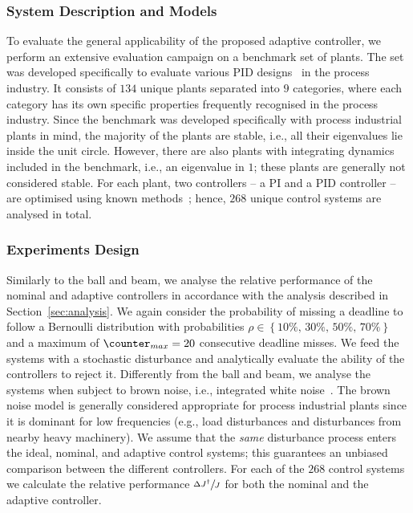 \subsubsection*{System Description and Models}
To evaluate the general applicability of the proposed adaptive controller, we perform an extensive evaluation campaign on a benchmark set of plants.
The set was developed specifically to evaluate various PID designs~\cite{Astrom:2004} in the process industry.
It consists of $134$ unique plants separated into $9$ categories, where each category has its own specific properties frequently recognised in the process industry.
Since the benchmark was developed specifically with process industrial plants in mind, the majority of the plants are stable, i.e., all their eigenvalues lie inside the unit circle.
However, there are also plants with integrating dynamics included in the benchmark, i.e., an eigenvalue in $1$; these plants are generally not considered stable.
For each plant, two controllers -- a PI and a PID controller -- are optimised using known methods~\cite{Garpinger:2008}; hence, $268$ unique control systems are analysed in total.

\subsubsection*{Experiments Design}
Similarly to the ball and beam, we analyse the relative performance of the nominal and adaptive controllers in accordance with the analysis described in Section~\ref{sec:analysis}.
We again consider the probability of missing a deadline to follow a Bernoulli distribution with probabilities $\rho \in \left\{ 10\%,\, 30\%,\, 50\%,\, 70\% \right\}$ and a maximum of $\counter_{max} = 20$ consecutive deadline misses.
We feed the systems with a stochastic disturbance and analytically evaluate the ability of the controllers to reject it.
Differently from the ball and beam, we analyse the systems when subject to brown noise, i.e., integrated white noise~\cite{Schmidt:1985}.
The brown noise model is generally considered appropriate for process industrial plants since it is dominant for low frequencies (e.g., load disturbances and disturbances from nearby heavy machinery).
We assume that the \emph{same} disturbance process enters the ideal, nominal, and adaptive control systems; this guarantees an unbiased comparison between the different controllers.
For each of the $268$ control systems we calculate the relative performance $\sfrac{\Delta J^\dagger}{J}$ for both the nominal and the adaptive controller.


